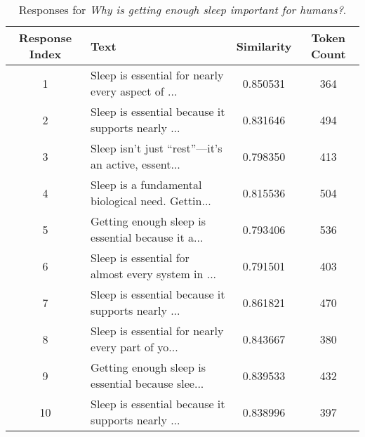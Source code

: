 \documentclass{article}
\begin{document}
\begin{table}[ht]
    \centering
    \caption{Responses for \textit{Why is getting enough sleep important for humans?}.}
    \label{tab:getting_enough_sleep}
    \begin{tabular}{c >{\raggedright\arraybackslash}p{8cm} S[table-format=1.6] c}
        \toprule
        Response Index & Text & Similarity & Token Count\\
         & Sleep is essential for nearly every aspect of ... & 0.850531 & 364\\
        2 & Sleep is essential because it supports nearly ... & 0.831646 & 494\\
        3 & Sleep isn’t just “rest”—it’s an active, essent... & 0.798350 & 413\\
        4 & Sleep is a fundamental biological need. Gettin... & 0.815536 & 504\\
        5 & Getting enough sleep is essential because it a... & 0.793406 & 536\\
        6 & Sleep is essential for almost every system in ... & 0.791501 & 403\\
        7 & Sleep is essential because it supports nearly ... & 0.861821 & 470\\
        8 & Sleep is essential for nearly every part of yo... & 0.843667 & 380\\
        9 & Getting enough sleep is essential because slee... & 0.839533 & 432\\
        10 & Sleep is essential because it supports nearly ... & 0.838996 & 397\\
        \bottomrule
    \end{tabular}
\end{table}
\end{document}
